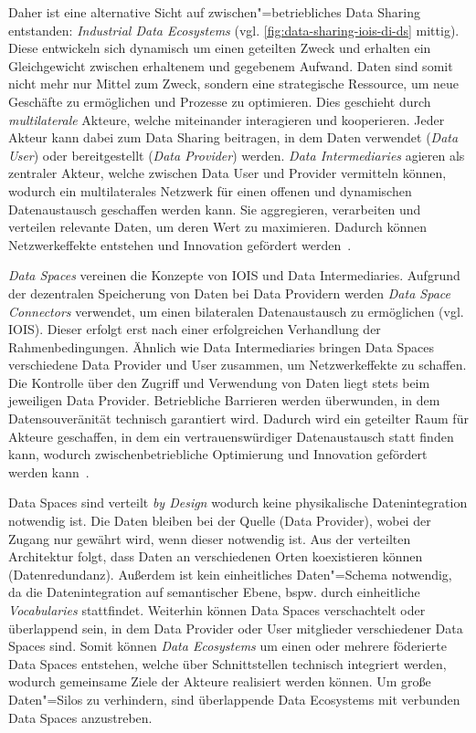 Daher ist eine alternative Sicht auf zwischen"=betriebliches Data Sharing entstanden: \emph{Industrial Data Ecosystems} (vgl. \autoref{fig:data-sharing-iois-di-ds} mittig).
Diese entwickeln sich dynamisch um einen geteilten Zweck und erhalten ein Gleichgewicht zwischen erhaltenem und gegebenem Aufwand.
Daten sind somit nicht mehr nur Mittel zum Zweck, sondern eine strategische Ressource, um neue Geschäfte zu ermöglichen und Prozesse zu optimieren.
Dies geschieht durch \emph{multilaterale} Akteure, welche miteinander interagieren und kooperieren.
Jeder Akteur kann dabei zum Data Sharing beitragen, in dem Daten verwendet (\emph{Data User}) oder bereitgestellt (\emph{Data Provider}) werden.
\emph{Data Intermediaries} agieren als zentraler Akteur, welche zwischen Data User und Provider vermitteln können, wodurch ein  multilaterales Netzwerk für einen offenen und dynamischen Datenaustausch geschaffen werden kann.
Sie aggregieren, verarbeiten und verteilen relevante Daten, um deren Wert zu maximieren.
Dadurch können Netzwerkeffekte entstehen und Innovation gefördert werden~\cite{mollerIndustrialDataEcosystems2024}.

\emph{Data Spaces} vereinen die Konzepte von IOIS und Data Intermediaries.
Aufgrund der dezentralen Speicherung von Daten bei Data Providern werden \emph{Data Space Connectors} verwendet, um einen bilateralen Datenaustausch zu ermöglichen (vgl. IOIS).
Dieser erfolgt erst nach einer erfolgreichen Verhandlung der Rahmenbedingungen.
Ähnlich wie Data Intermediaries bringen Data Spaces verschiedene Data Provider und User zusammen, um Netzwerkeffekte zu schaffen.
Die Kontrolle über den Zugriff und Verwendung von Daten liegt stets beim jeweiligen Data Provider.
Betriebliche Barrieren werden überwunden, in dem Datensouveränität technisch garantiert wird.
Dadurch wird ein geteilter Raum für Akteure geschaffen, in dem ein vertrauenswürdiger Datenaustausch statt finden kann, wodurch zwischenbetriebliche Optimierung und Innovation gefördert werden kann~\cite{mollerIndustrialDataEcosystems2024}.

Data Spaces sind verteilt \emph{by Design} wodurch keine physikalische Datenintegration notwendig ist.
Die Daten bleiben bei der Quelle (Data Provider), wobei der Zugang nur gewährt wird, wenn dieser notwendig ist.
Aus der verteilten Architektur folgt, dass Daten an verschiedenen Orten koexistieren können (Datenredundanz).
Außerdem ist kein einheitliches Daten"=Schema notwendig, da die Datenintegration auf semantischer Ebene, bspw. durch einheitliche \emph{Vocabularies} stattfindet.
Weiterhin können Data Spaces verschachtelt oder überlappend sein, in dem Data Provider oder User mitglieder verschiedener Data Spaces sind.
Somit können \emph{Data Ecosystems} um einen oder mehrere föderierte Data Spaces entstehen, welche über Schnittstellen technisch integriert werden, wodurch gemeinsame Ziele der Akteure realisiert werden können.
Um große Daten"=Silos zu verhindern, sind überlappende Data Ecosystems mit verbunden Data Spaces anzustreben.

